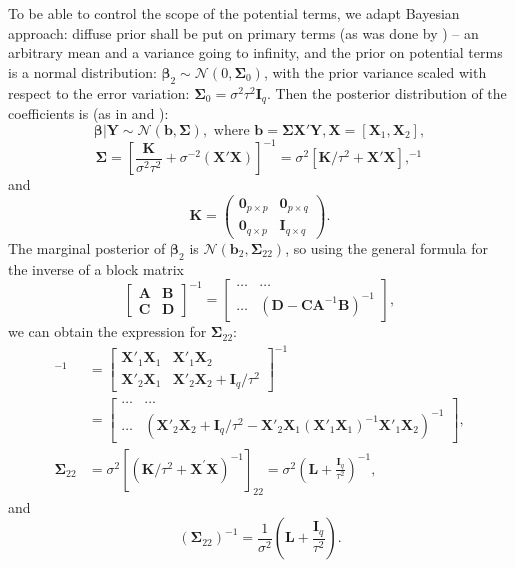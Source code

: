 To be able to control the scope of the potential terms, we adapt Bayesian approach:  diffuse prior shall be put on primary terms (as was done by \cite{DuMouchel1994}) -- an arbitrary mean and a variance going to infinity, and the prior on potential terms is a normal distribution: $\bm{\beta}_2\sim\mathcal{N}(0,\bm{\Sigma}_{0})$, with the prior variance scaled with respect to the error variation:
$\bm{\Sigma}_{0}=\sigma^{2}\tau^{2}\bm{I}_{q}$. Then the posterior
distribution of the coefficients is (as in \cite{Koch2007introduction} and \cite{DuMouchel1994}):
$$\bm{\beta}|\bm{Y}\sim \mathcal{N}(\bm{b},\bm{\Sigma}),\mbox{ where }\bm{b}=\bm{\Sigma X}'\bm{Y}, \bm{X}=[\bm{X}_1, \bm{X}_2],$$
$$\bm{\Sigma}=\left[\frac{\bm{K}}{\sigma^{2}\tau^{2}}+\sigma^{-2}(\bm{X'X})\right]^{-1}=\sigma^{2}[\bm{K}/\tau^{2}+\bm{X'}\bm{X}],^{-1}$$
and 
\begin{equation*}
\bm{K}=\begin{pmatrix}
\bm{0}_{p\times p} & \bm{0}_{p\times q}\\
\bm{0}_{q\times p} & \bm{I}_{q\times q}
\end{pmatrix}.
\end{equation*}
The marginal posterior of $\bm{\beta}_2$ is $\mathcal{N}(\bm{b}_{2},\bm{\Sigma}_{22})$, so using the general formula for the inverse of a block matrix
$$\begin{bmatrix}
 \bm{A}& \bm{B}\\
 \bm{C}& \bm{D}
\end{bmatrix}^{-1}=\begin{bmatrix}
\ldots & \ldots\\
\ldots & (\bm{D}-\bm{CA}^{-1}\bm{B})^{-1}
\end{bmatrix},$$
we can obtain the expression for $\bm{\Sigma}_{22}$:
\begin{align*}
[\bm{K}/\tau^{2}+\bm{X}'\bm{X}]^{-1}&=\begin{bmatrix}
 \bm{X}'_1\bm{X}_1& \bm{X}'_1\bm{X}_2 \\
 \bm{X}'_2\bm{X}_1& \bm{X}'_2\bm{X}_2+\bm{I}_{q}/\tau^{2}
\end{bmatrix}^{-1}\\&=\begin{bmatrix}
\ldots & \ldots\\
\ldots &
(\bm{X}'_2\bm{X}_2+\bm{I}_{q}/\tau^{2}-\bm{X}'_2\bm{X}_1(\bm{X}'_1\bm{X}_1)^{-1}\bm{X}'_1\bm{X}_2)^{-1}
\end{bmatrix},\\
\bm{\Sigma}_{22}&=\sigma^{2}[(\bm{K}/\tau^{2}+\bm{X}^{'}\bm{X})^{-1}]_{22}=\sigma^{2}\left(\bm{L}+\frac{\bm{I}_{q}}{\tau^{2}}\right)^{-1},
\end{align*} 
and $$(\bm{\Sigma}_{22})^{-1}=\frac{1}{\sigma^{2}}\left(\bm{L}+\frac{\bm{I}_{q}}{\tau^{2}}\right).$$

